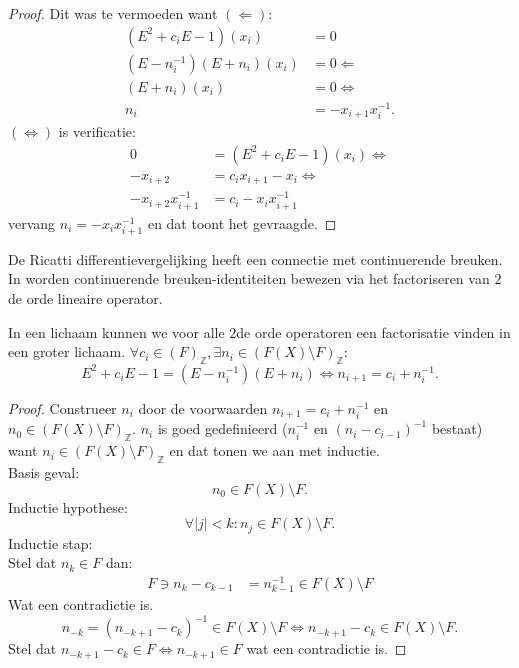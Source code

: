 \documentclass[a4paper,12pt]{article}
\begin{document}
\begin{proof}
    Dit was te vermoeden want
    $(\Leftarrow):$
    \begin{align*}
        (E^2 + c_i E -1)(x_i)        & = 0                 \\
        (E - n_i^{-1})(E + n_i)(x_i) & = 0 \Leftarrow      \\
        (E + n_i)(x_i)               & = 0 \Leftrightarrow \\
        n_i                          & = -x_{i+1}x_i^{-1}.
    \end{align*}
    $(\Leftrightarrow)$ is verificatie:
    \begin{align*}
        0                     & = (E^2 + c_i E -1)(x_i)      \Leftrightarrow \\
        -x_{i+2}              & =  c_i x_{i+1} - x_i  \Leftrightarrow        \\
        -x_{i+2} x_{i+1}^{-1} & = c_i - x_i x_{i+1}^{-1}
    \end{align*}
    vervang $n_i = - x_i x_{i+1}^{-1}$ en dat toont het gevraagde.
\end{proof}

\begin{remark}
    De Ricatti differentievergelijking heeft een connectie met continuerende breuken.
    In \cite{https://doi.org/10.48550/arxiv.2103.03554} worden continuerende breuken-identiteiten bewezen via het factoriseren van
    $2$de orde lineaire operator.
\end{remark}


\begin{theorem}
    In een lichaam kunnen we voor alle $2$de orde operatoren een factorisatie vinden in een groter lichaam.
    $\forall c_i \in (F)_{\mathbb{Z}}, \exists n_i \in (F(X)\setminus F)_{\mathbb{Z}}:$
    $$
        E^2 +c_i E -1 = (E - n_i^{-1})(E + n_i) \Leftrightarrow n_{i+1} = c_i + n_i^{-1}.
    $$
\end{theorem}

\begin{proof}
    Construeer $n_i$ door de voorwaarden $n_{i+1} = c_i + n_i^{-1}$ en
    $n_0\in (F(X)\setminus F)_{\mathbb{Z}}$.
    $n_i$ is goed gedefinieerd ($n_i^{-1}$ en $(n_{i} - c_{i-1})^{-1}$ bestaat) want $n_i \in (F(X)\setminus F)_{\mathbb{Z}}$ en
    dat tonen we aan met inductie.\\
    Basis geval:
    $$
        n_0  \in F(X)\setminus F.
    $$
    Inductie hypothese:
    $$
        \forall |j|<k: n_j \in F(X)\setminus F.
    $$
    Inductie stap:\\
    Stel dat $n_{k} \in F$ dan:
    \begin{align*}
        F \ni n_{k} -c_{k-1} & = n_{k-1}^{-1} \in F(X)\setminus F
    \end{align*}
    Wat een contradictie is.\\
    $$n_{-k} = (n_{-k+1} - c_{k})^{-1} \in F(X)\setminus F \Leftrightarrow n_{-k+1} - c_{k} \in F(X)\setminus F.$$
    Stel dat $ n_{-k+1} - c_{k} \in F \Leftrightarrow n_{-k+1} \in F$ wat een contradictie is.






\end{proof}
\end{document}
